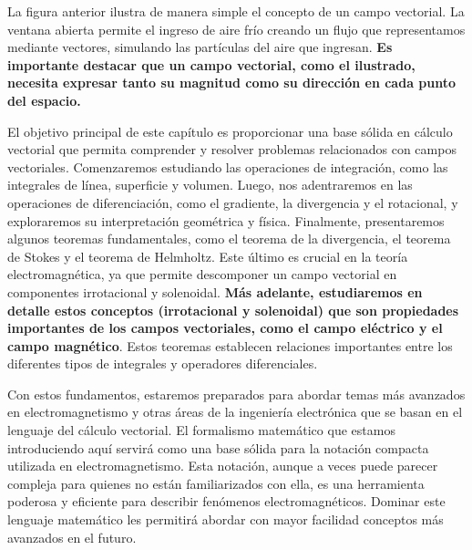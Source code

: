 \documentclass{article}
\begin{document}
\begin{center}
\end{center}

La figura anterior ilustra de manera simple el concepto de un campo vectorial. La ventana abierta permite el ingreso de aire frío creando un flujo que representamos mediante vectores, simulando las partículas del aire que ingresan. \textbf{Es importante destacar que un campo vectorial, como el ilustrado, necesita expresar tanto su magnitud como su dirección en cada punto del espacio.}

El objetivo principal de este capítulo es proporcionar una base sólida en cálculo vectorial que permita comprender y resolver problemas relacionados con campos vectoriales. Comenzaremos estudiando las operaciones de integración, como las integrales de línea, superficie y volumen. Luego, nos adentraremos en las operaciones de diferenciación, como el gradiente, la divergencia y el rotacional, y exploraremos su interpretación geométrica y física. Finalmente, presentaremos algunos teoremas fundamentales, como el teorema de la divergencia, el teorema de Stokes y el teorema de Helmholtz. Este último es crucial en la teoría electromagnética, ya que permite descomponer un campo vectorial en componentes irrotacional y solenoidal. \textbf{Más adelante, estudiaremos en detalle estos conceptos (irrotacional y solenoidal) que son propiedades importantes de los campos vectoriales, como el campo eléctrico y el campo magnético}. Estos teoremas establecen relaciones importantes entre los diferentes tipos de integrales y operadores diferenciales.

Con estos fundamentos, estaremos preparados para abordar temas más avanzados en electromagnetismo y otras áreas de la ingeniería electrónica que se basan en el lenguaje del cálculo vectorial.  El formalismo matemático que estamos introduciendo aquí servirá como una base sólida para la notación compacta utilizada en electromagnetismo. Esta notación, aunque a veces puede parecer compleja para quienes no están familiarizados con ella, es una herramienta poderosa y eficiente para describir fenómenos electromagnéticos. Dominar este lenguaje matemático les permitirá abordar con mayor facilidad conceptos más avanzados en el futuro. 
\end{document}
